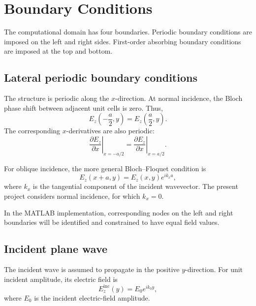 \documentclass{article}
\begin{document}
\chapter{Boundary Conditions}

The computational domain has four boundaries. Periodic boundary
conditions are imposed on the left and right sides. First-order
absorbing boundary conditions are imposed at the top and bottom.

\section{Lateral periodic boundary conditions}

The structure is periodic along the $x$-direction. At normal incidence,
the Bloch phase shift between adjacent unit cells is zero. Thus,
\begin{equation}
    E_z\left(-\frac{a}{2},y\right)
    =
    E_z\left(\frac{a}{2},y\right).
    \label{eq:periodic_field}
\end{equation}
The corresponding $x$-derivatives are also periodic:
\begin{equation}
    \left.\frac{\partial E_z}{\partial x}\right|_{x=-a/2}
    =
    \left.\frac{\partial E_z}{\partial x}\right|_{x=a/2}.
    \label{eq:periodic_derivative}
\end{equation}

For oblique incidence, the more general Bloch--Floquet condition is
\begin{equation}
    E_z(x+a,y)=E_z(x,y)e^{ik_xa},
\end{equation}
where $k_x$ is the tangential component of the incident wavevector.
The present project considers normal incidence, for which $k_x=0$.

In the MATLAB implementation, corresponding nodes on the left and
right boundaries will be identified and constrained to have equal
field values.

\section{Incident plane wave}

The incident wave is assumed to propagate in the positive $y$-direction.
For unit incident amplitude, its electric field is
\begin{equation}
    E_z^{\mathrm{inc}}(y)=E_0e^{ik_0y},
    \label{eq:incident_wave}
\end{equation}
where $E_0$ is the incident electric-field amplitude.
\end{document}
